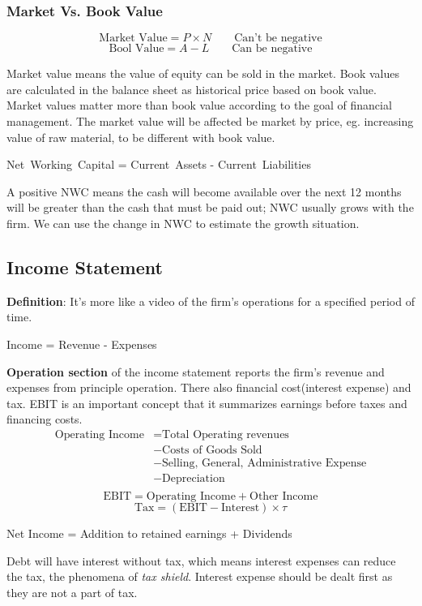 \documentclass[10pt, a4paper]{article}
\begin{document}
        \subsubsection{Market Vs. Book Value}
            $$\text{Market\ Value} = P \times N \quad\quad \text{Can't be negative}$$ 
            $$\text{Bool\ Value} = A - L \quad\quad \text{Can be negative}$$

            Market value means the value of equity can be sold in the market. Book values are calculated in the balance sheet as historical price based on book value. Market values matter more than book value according to the goal of financial management. The market value will be affected be market by price, eg. increasing value of raw material, to be different with book value. 
            \begin{center}   
            Net\ Working\ Capital = Current\ Assets - Current\ Liabilities
            \end{center}
            A positive NWC means the cash will become available over the next 12 months will be greater than the cash that must be paid out; NWC usually grows with the firm. We can use the change in NWC to estimate the growth situation.


    \subsection{Income Statement}
        \textbf{Definition}: It's more like a video of the firm's operations for a specified period of time.

        \begin{center}
        Income = Revenue - Expenses
        \end{center}

        \textbf{Operation section} of the income statement reports the firm's revenue and expenses from principle operation. There also financial cost(interest expense) and tax. EBIT is an important concept that it summarizes earnings before taxes and financing costs. 
        \begin{align*}
            \text{Operating\ Income} &= \text{Total\ Operating\ revenues} \\   
                              &- \text{Costs\ of\ Goods\ Sold} \\
                              &- \text{Selling,\ General,\ Administrative\ Expense}\\
                              &- \text{Depreciation} \\
        \end{align*}  
            $$\text{EBIT} = \text{Operating\ Income} + \text{Other Income}$$
            $$\text{Tax} = (\text{EBIT} - \text{Interest}) \times \tau $$
            \begin{center}
                Net Income = Addition to retained earnings + Dividends
            \end{center}
         Debt will have interest without tax, which means interest expenses can reduce the tax, the phenomena of \emph{tax shield}. Interest expense should be dealt first as they are not a part of tax. 
        
\end{document}
